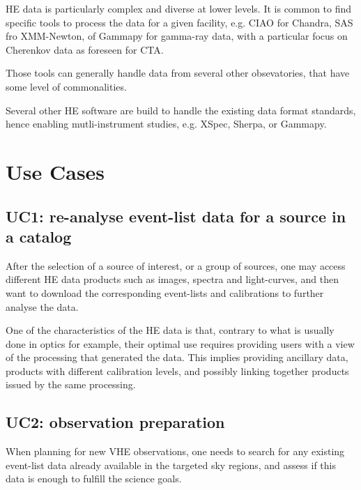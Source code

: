 \documentclass[11pt,a4paper]{ivoa}
\begin{document}
HE data is particularly complex and diverse at lower levels. It is common to find specific tools to process the data for a given facility, e.g. CIAO for Chandra, SAS fro XMM-Newton, of Gammapy for gamma-ray data, with a particular focus on Cherenkov data as foreseen for CTA.

Those tools can generally handle data from several other obsevatories, that have some level of commonalities.

Several other HE software are build to handle the existing data format standards, hence enabling mutli-instrument studies, e.g. XSpec, Sherpa, or Gammapy.





\section{Use Cases}

\subsection{UC1: re-analyse event-list data for a source in a catalog}

After the selection of a source of interest, or a group of sources, one may access different HE data products such as
images, spectra and light-curves, and then want to download the corresponding event-lists and calibrations to further
analyse the data.

One of the characteristics of the HE data is that, contrary to what is usually done in optics for example, their optimal
use requires providing users with a view of the processing that generated the data. This implies providing ancillary data,
products with different calibration levels, and possibly linking together products issued by the same processing.


\subsection{UC2: observation preparation}

When planning for new VHE observations, one needs to search for any existing event-list data already available in the
targeted sky regions, and assess if this data is enough to fulfill the science goals.
\end{document}
